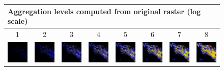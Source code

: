 \documentclass{itatnew}
\begin{document}
\begin{figure}[htp]
  \centering
  \begin{tabular}{cccccccc}
    \multicolumn{8}{l}{
      Aggregation levels computed from original raster (log scale)
    }\\
    \hline
    1 & 2 & 3 & 4 & 5 & 6 & 7 & 8 \\
    \includegraphics[width=4.6em]{images/gen-rawdata-1}&
    \includegraphics[width=4.6em]{images/gen-rawdata-2}&
    \includegraphics[width=4.6em]{images/gen-rawdata-3}&
    \includegraphics[width=4.6em]{images/gen-rawdata-4}&
    \includegraphics[width=4.6em]{images/gen-rawdata-5}&
    \includegraphics[width=4.6em]{images/gen-rawdata-6}&
    \includegraphics[width=4.6em]{images/gen-rawdata-7}&
    \includegraphics[width=4.6em]{images/gen-rawdata-8}
  \end{tabular}
  

\end{figure}
\end{document}
